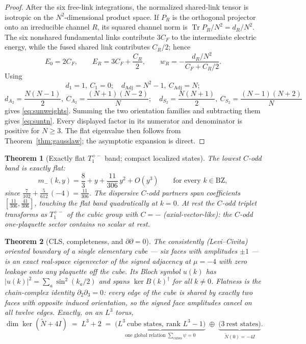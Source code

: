 \documentclass[11pt]{article}
\newtheorem{theorem}{Theorem}[section]
\newcommand{\Tr}{\operatorname{Tr}}
\newcommand{\Nt}{\widetilde N}
\begin{document}
\begin{proof}
After the six free-link integrations, the normalized shared-link tensor is
isotropic on the $N^2$-dimensional product space. If $P_R$ is the orthogonal
projector onto an irreducible channel $R$, its squared channel norm is
$\Tr P_R/N^2=d_R/N^2$. The six nonshared fundamental links contribute
$3C_F$ to the intermediate electric energy, while the fused shared link
contributes $C_R/2$; hence
\[
E_0=2C_F,\qquad E_R=3C_F+\frac{C_R}{2},\qquad
w_R=-\frac{d_R/N^2}{C_F+C_R/2}.
\]
Using
\[
d_1=1,\ C_1=0;\quad d_{\mathrm{Adj}}=N^2-1,\ C_{\mathrm{Adj}}=N;
\]
\[
d_{A_2}=\frac{N(N-1)}2,\ C_{A_2}=\frac{(N+1)(N-2)}N;\quad
 d_{S_2}=\frac{N(N+1)}2,\ C_{S_2}=\frac{(N-1)(N+2)}N
\]
gives \eqref{eq:sunweights}. Summing the two orientation families and
subtracting them gives \eqref{eq:suntn}. Every displayed factor in its
numerator and denominator is positive for $N\geq3$. The flat eigenvalue then
follows from Theorem~\ref{thm:gausslaw}; the asymptotic expansion is direct.
\end{proof}

\begin{theorem}[Exactly flat $T_1^{+-}$ band; compact localized states]
\label{thm:flatband}
The lowest $C$-odd band is exactly flat:
\begin{equation}
m_-(k,y)=\frac83+y+\frac{11}{306}\,y^2+O(y^3)
\qquad\text{for every }k\in\mathrm{BZ},
\end{equation}
since $\tfrac{7}{102}+\tfrac{5}{612}\,(-4)=\tfrac{11}{306}$. The dispersive
$C$-odd partners span coefficients $[\tfrac{11}{306},\tfrac{41}{306}]$,
touching the flat band quadratically at $k=0$. At rest the $C$-odd triplet
transforms as $T_1^{+-}$ of the cubic group with $C=-$ (axial-vector-like):
\emph{the $C$-odd one-plaquette sector contains no scalar at rest}.
\end{theorem}

\begin{theorem}[CLS, completeness, and $\partial\partial=0$]\label{thm:cls}
The consistently (Levi--Civita) oriented boundary of a single elementary
cube --- six faces with amplitudes $\pm1$ --- is an exact real-space
eigenvector of the signed adjacency at $\mu=-4$ with zero leakage onto any
plaquette off the cube. Its Bloch symbol $u(k)$ has
$|u(k)|^2=\sum_a\sin^2(k_a/2)$ and spans $\ker B(k)^\dagger$ for all
$k\neq0$. Flatness is the chain-complex identity
$\partial_2\partial_3=0$: every edge of the cube is shared by exactly two
faces with opposite induced orientation, so the signed face amplitudes cancel
on all twelve edges. Exactly, on an $L^3$ torus,
\begin{equation}
\dim\ker(\Nt+4I)\;=\;L^3+2\;=\;
\underbrace{\bigl(L^3\ \text{cube states},\ \text{rank }L^3-1\bigr)}_{
\text{one global relation }\sum_{\mathrm{cubes}}\psi=0}
\;\oplus\;
\underbrace{\bigl(3\ \text{rest states}\bigr)}_{\Nt(0)=-4I}.
\end{equation}
\end{theorem}
\end{document}

